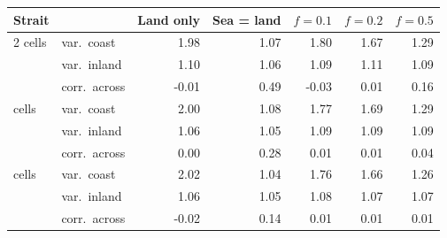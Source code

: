 \begin{tabular}{@{}llrrrrr@{}}
\toprule
Strait & & Land only & Sea = land & $f=0.1$ & $f=0.2$ & $f=0.5$ \\
\midrule
2 cells & var.\ coast & 1.98 & 1.07 & 1.80 & 1.67 & 1.29 \\
 & var.\ inland & 1.10 & 1.06 & 1.09 & 1.11 & 1.09 \\
 & corr.\ across & -0.01 & 0.49 & -0.03 & 0.01 & 0.16 \\
\addlinespace
4 cells & var.\ coast & 2.00 & 1.08 & 1.77 & 1.69 & 1.29 \\
 & var.\ inland & 1.06 & 1.05 & 1.09 & 1.09 & 1.09 \\
 & corr.\ across & 0.00 & 0.28 & 0.01 & 0.01 & 0.04 \\
\addlinespace
6 cells & var.\ coast & 2.02 & 1.04 & 1.76 & 1.66 & 1.26 \\
 & var.\ inland & 1.06 & 1.05 & 1.08 & 1.07 & 1.07 \\
 & corr.\ across & -0.02 & 0.14 & 0.01 & 0.01 & 0.01 \\
\bottomrule
\end{tabular}
